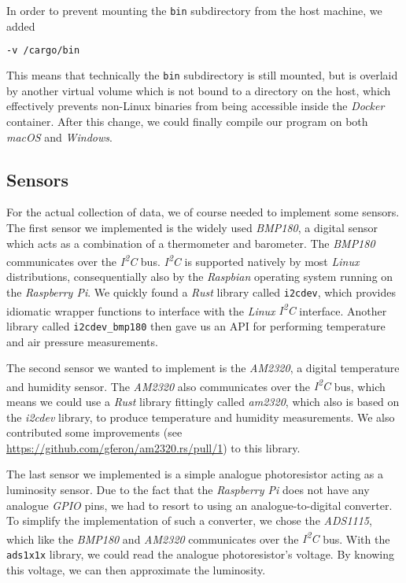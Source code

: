 In order to prevent mounting the \texttt{bin} subdirectory from the host machine, we added

\begin{lstlisting}[language=Bash]
-v /cargo/bin
\end{lstlisting}

This means that technically the \texttt{bin} subdirectory is still mounted, but is overlaid by
another virtual volume which is not bound to a directory on the host, which effectively prevents
non-Linux binaries from being accessible inside the \textit{Docker} container. After this change, we could
finally compile our program on both \textit{macOS} and \textit{Windows}.

\subsection{Sensors}

For the actual collection of data, we of course needed to implement some sensors. The first sensor
we implemented is the widely used \textit{BMP180}, a digital sensor which acts as a combination of a
thermometer and barometer. The \textit{BMP180} communicates over the \textit{I\textsuperscript{2}C}
bus. \textit{I\textsuperscript{2}C} is supported natively by most \textit{Linux} distributions,
consequentially also by the \textit{Raspbian} operating system running on the \textit{Raspberry Pi}.
We quickly found a \textit{Rust} library called \texttt{i2cdev}, which provides idiomatic wrapper functions
to interface with the \textit{Linux} \textit{I\textsuperscript{2}C} interface. Another library
called \texttt{i2cdev\_bmp180} then gave us an API for performing temperature and air pressure
measurements.

The second sensor we wanted to implement is the \textit{AM2320}, a digital temperature and humidity
sensor. The \textit{AM2320} also communicates over the \textit{I\textsuperscript{2}C} bus, which
means we could use a \textit{Rust} library fittingly called \textit{am2320}, which also is based on the
\textit{i2cdev} library, to produce temperature and humidity measurements. We also contributed some
improvements (see \url{https://github.com/gferon/am2320.rs/pull/1}) to this library.

The last sensor we implemented is a simple analogue photoresistor acting as a luminosity sensor. Due
to the fact that the \textit{Raspberry Pi} does not have any analogue \textit{GPIO} pins, we had to
resort to using an analogue-to-digital converter. To simplify the implementation of such a
converter, we chose the \textit{ADS1115}, which like the \textit{BMP180} and \textit{AM2320}
communicates over the \textit{I\textsuperscript{2}C} bus. With the \texttt{ads1x1x} library, we
could read the analogue photoresistor's voltage. By knowing this voltage, we can then
approximate the luminosity.

